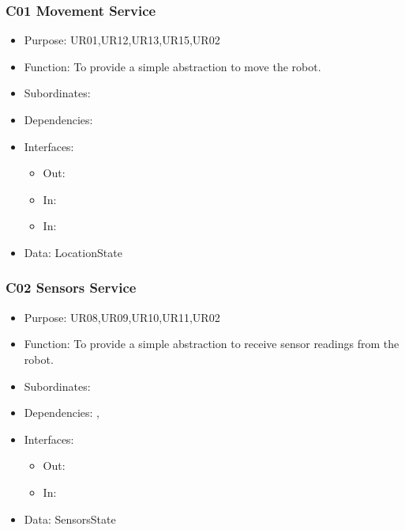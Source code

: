 \subsubsection{C01 Movement Service} \label{compMove}
\begin{itemize}
	\item Purpose: UR01,UR12,UR13,UR15,UR02
	\item Function: To provide a simple abstraction to move the robot.
	\item Subordinates: 
	\item Dependencies: 
	\item Interfaces:
	\begin{itemize}
		\item Out: \texttt{}
		\item In: \texttt{}
		\item In: \texttt{}
	\end{itemize}
	\item Data: LocationState
\end{itemize}

\subsubsection{C02 Sensors Service} \label{compSense}
\begin{itemize}
	\item Purpose: UR08,UR09,UR10,UR11,UR02
	\item Function: To provide a simple abstraction to receive sensor readings from the robot. 
	\item Subordinates: 
	\item Dependencies: , 
	\item Interfaces:
	\begin{itemize}
		\item Out: \texttt{}
		\item In: \texttt{}
	\end{itemize}
	\item Data: SensorsState
\end{itemize}

